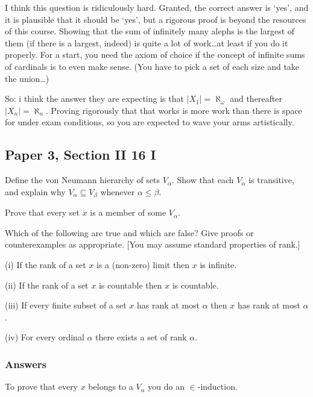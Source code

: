 \documentclass{book}
\begin{document}
\smallskip

I think this question is ridiculously hard. Granted, the correct
answer is `yes', and it is plausible that it should be `yes', but a
rigorous proof is beyond the resources of this course.  Showing that
the sum of infinitely many alephs is the largest of them (if there is
a largest, indeed) is quite a lot of work\ldots at least if you do it
properly.  For a start, you need the axiom of choice if the concept of
infinite sums of cardinals is to even make sense.  (You have to pick a
set of each size and take the union\ldots)

So: i think the answer they are expecting is that $|X_1| = \aleph_\omega$
and thereafter $|X_n| = \aleph_n$.  Proving rigorously that that works
is more work than there is space for under exam conditions, so you are
expected to wave your arms artistically.


\subsection*{Paper 3, Section II 16 I}

Define the von Neumann hierarchy of sets $V_\alpha$. Show that each
$V_\alpha$ is transitive, and explain why $V_\alpha \subseteq V_\beta$
whenever $\alpha \leq \beta$.

\smallskip

Prove that every set $x$ is a member of some $V_\alpha$.

\smallskip

Which of the following are true and which are false? Give proofs or
counterexamples as appropriate. [You may assume standard properties of
  rank.]

\smallskip

(i) If the rank of a set $x$ is a (non-zero) limit then $x$ is infinite.

(ii) If the rank of a set $x$ is countable then $x$ is countable.

(iii) If every finite subset of a set $x$ has rank at most $\alpha$ then $x$ has rank at most $\alpha$.

(iv) For every ordinal $\alpha$ there exists a set of rank $\alpha$.

\subsubsection*{Answers}
To prove that every $x$ belongs to a $V_\alpha$ you do an $\in$-induction.

\medskip
\end{document}
